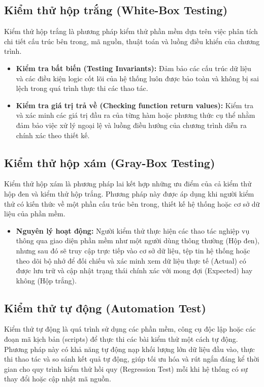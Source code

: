 \documentclass{report}
\begin{document}
\subsection{Kiểm thử hộp trắng (White-Box Testing)}

Kiểm thử hộp trắng là phương pháp kiểm thử phần mềm dựa trên việc phân tích chi tiết cấu trúc bên trong, mã nguồn, thuật toán và luồng điều khiển của chương trình.
\begin{itemize}
    \item \textbf{Kiểm tra bất biến (Testing Invariants):} Đảm bảo các cấu trúc dữ liệu và các điều kiện logic cốt lõi của hệ thống luôn được bảo toàn và không bị sai lệch trong quá trình thực thi các thao tác.
    \item \textbf{Kiểm tra giá trị trả về (Checking function return values):} Kiểm tra và xác minh các giá trị đầu ra của từng hàm hoặc phương thức cụ thể nhằm đảm bảo việc xử lý ngoại lệ và luồng điều hướng của chương trình diễn ra chính xác theo thiết kế.
\end{itemize}

\subsection{Kiểm thử hộp xám (Gray-Box Testing)}

Kiểm thử hộp xám là phương pháp lai kết hợp những ưu điểm của cả kiểm thử hộp đen và kiểm thử hộp trắng. Phương pháp này được áp dụng khi người kiểm thử có kiến thức về một phần cấu trúc bên trong, thiết kế hệ thống hoặc cơ sở dữ liệu của phần mềm.
\begin{itemize}
    \item \textbf{Nguyên lý hoạt động:} Người kiểm thử thực hiện các thao tác nghiệp vụ thông qua giao diện phần mềm như một người dùng thông thường (Hộp đen), nhưng sau đó sẽ truy cập trực tiếp vào cơ sở dữ liệu, tệp tin hệ thống hoặc theo dõi bộ nhớ để đối chiếu và xác minh xem dữ liệu thực tế (Actual) có được lưu trữ và cập nhật trạng thái chính xác với mong đợi (Expected) hay không (Hộp trắng).
\end{itemize}

\subsection{Kiểm thử tự động (Automation Test)}

Kiểm thử tự động là quá trình sử dụng các phần mềm, công cụ độc lập hoặc các đoạn mã kịch bản (scripts) để thực thi các bài kiểm thử một cách tự động. Phương pháp này có khả năng tự động nạp khối lượng lớn dữ liệu đầu vào, thực thi thao tác và so sánh kết quả tự động, giúp tối ưu hóa và rút ngắn đáng kể thời gian cho quy trình kiểm thử hồi quy (Regression Test) mỗi khi hệ thống có sự thay đổi hoặc cập nhật mã nguồn.
\end{document}
